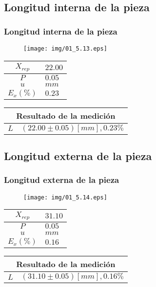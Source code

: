 \documentclass[letter,11pt]{beamer}
\begin{document}
\subsection{Longitud interna de la pieza}
\begin{frame}
\frametitle{Longitud interna de la pieza}
\vspace*{0.8cm}
\begin{figure}
\centering
\texttt{[image: img/01\_5.13.eps]}
\end{figure}
\vspace*{0.4cm}
\scriptsize
\begin{tabular}{|c|>{\centering}m{1.8cm}<{\centering}|}
\hline
$X_{rep}$ &  $22.00$ \tabularnewline \hline
      $P$ &   $0.05$ \tabularnewline \hline
      $u$ &     $mm$ \tabularnewline \hline
$E_x(\%)$ &   $0.23$ \tabularnewline \hline
\end{tabular}
\quad
\begin{tabular}{|c|>{\centering}m{5.7cm}<{\centering}|}
\hline
\multicolumn{2}{|c|}{\textbf{Resultado de la medición}} \\ \hline
$L$ & $( 22.00\pm0.05)[mm], 0.23\%$ \tabularnewline \hline
\end{tabular}
\end{frame}

\subsection{Longitud externa de la pieza}
\begin{frame}
\frametitle{Longitud externa de la pieza}
\vspace*{0.8cm}
\begin{figure}
\centering
\texttt{[image: img/01\_5.14.eps]}
\end{figure}
\vspace*{0.4cm}
\scriptsize
\begin{tabular}{|c|>{\centering}m{1.8cm}<{\centering}|}
\hline
$X_{rep}$ &  $31.10$ \tabularnewline \hline
      $P$ &   $0.05$ \tabularnewline \hline
      $u$ &     $mm$ \tabularnewline \hline
$E_x(\%)$ &   $0.16$ \tabularnewline \hline
\end{tabular}
\quad
\begin{tabular}{|c|>{\centering}m{5.7cm}<{\centering}|}
\hline
\multicolumn{2}{|c|}{\textbf{Resultado de la medición}} \\ \hline
$L$ & $( 31.10\pm0.05)[mm], 0.16\%$ \tabularnewline \hline
\end{tabular}
\end{frame}
\end{document}
